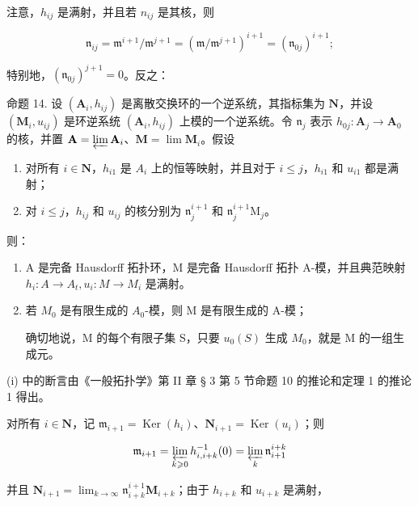 	注意，\(h_{ij}\) 是满射，并且若 \(n_{ij}\) 是其核，则

\[
\mathfrak {n} _ {i j} = \mathfrak {m} ^ {i + 1} / \mathfrak {m} ^ {j + 1} = (\mathfrak {m} / \mathfrak {m} ^ {j + 1}) ^ {i + 1} = (\mathfrak {n} _ {0 j}) ^ {i + 1};
\]

	特别地，\((\mathfrak{n}_{0j})^{j + 1} = 0\)。反之：

	命题 14. 设 \((\mathbf{A}_i, h_{ij})\) 是离散交换环的一个逆系统，其指标集为 \(\mathbf{N}\)，并设 \((\mathbf{M}_i, u_{ij})\) 是环逆系统 \((\mathbf{A}_i, h_{ij})\) 上模的一个逆系统。令 \(\mathfrak{n}_j\) 表示 \(h_{0j} \colon \mathbf{A}_j \to \mathbf{A}_0\) 的核，并置 \(\mathbf{A} = \varprojlim \mathbf{A}_i\)、\(\mathbf{M} = \lim \mathbf{M}_i\)。假设

\begin{enumerate}
\def\labelenumi{(\alph{enumi})}
\item
	  对所有 \(i \in \mathbf{N}\)，\(h_{i1}\) 是 \(A_i\) 上的恒等映射，并且对于 \(i \leqslant j\)，\(h_{i1}\) 和 \(u_{i1}\) 都是满射；
\item
	  对 \(i \leqslant j\)，\(h_{ij}\) 和 \(u_{ij}\) 的核分别为 \(\mathfrak{n}_j^{i+1}\) 和 \(\mathfrak{n}_j^{i+1}\mathrm{M}_j\)。
\end{enumerate}

	则：

\begin{enumerate}
\def\labelenumi{(\roman{enumi})}
\item
	  A 是完备 Hausdorff 拓扑环，M 是完备 Hausdorff 拓扑 A-模，并且典范映射 \(h_{i}: A \to A_{t}, u_{i}: M \to M_{i}\) 是满射。
\item
	  若 \(M_{0}\) 是有限生成的 \(A_{0}\)-模，则 M 是有限生成的 A-模；

	  确切地说，M 的每个有限子集 S，只要 \(u_{0}(S)\) 生成 \(M_{0}\)，就是 M 的一组生成元。
\end{enumerate}

	(i) 中的断言由《一般拓扑学》第 II 章 § 3 第 5 节命题 10 的推论和定理 1 的推论 1 得出。

	对所有 \(i \in \mathbf{N}\)，记 \(\mathfrak{m}_{i+1} = \operatorname{Ker}(h_i)\)、\(\mathbf{N}_{i+1} = \operatorname{Ker}(u_i)\)；则

\[
\mathfrak {m} _ {i + 1} = \varprojlim_ {k \geqslant 0} h _ {i, i + k} ^ {- 1} (0) = \varprojlim_ {k} \mathfrak {n} _ {i + 1} ^ {i + k}
\]

	并且 \(\mathbf{N}_{i + 1} = \lim_{k\to \infty}\mathfrak{n}_{i + k}^{i + 1}\mathbf{M}_{i + k}\)；由于 \(h_{i + k}\) 和 \(u_{i + k}\) 是满射，

